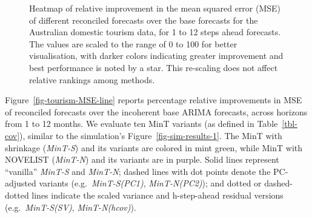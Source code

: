 \documentclass[
  11pt,
  letterpaper,
  DIV=11,
  numbers=noendperiod,
  titlepage]{scrartcl}
\begin{document}
\begin{figure}


\caption{\label{fig-tourism-MSE-heat}Heatmap of relative improvement in
the mean squared error (MSE) of different reconciled forecasts over the
base forecasts for the Australian domestic tourism data, for 1 to 12
steps ahead forecasts. The values are scaled to the range of 0 to 100
for better visualisation, with darker colors indicating greater
improvement and best performance is noted by a star. This re-scaling
does not affect relative rankings among methods.}

\end{figure}%

Figure~\ref{fig-tourism-MSE-line} reports percentage relative
improvements in MSE of reconciled forecasts over the incoherent base
ARIMA forecasts, across horizons from 1 to 12 months. We evaluate ten
MinT variants (as defined in Table~\ref{tbl-cov}), similar to the
simulation's Figure~\ref{fig-sim-results-1}. The MinT with shrinkage
(\emph{MinT-S}) and its variants are colored in mint green, while MinT
with NOVELIST (\emph{MinT-N}) and its variants are in purple. Solid
lines represent ``vanilla'' \emph{MinT-S} and \emph{MinT-N}; dashed
lines with dot points denote the PC-adjusted variants
(e.g.~\emph{MinT-S(PC1)}, \emph{MinT-N(PC2)}); and dotted or
dashed-dotted lines indicate the scaled variance and h-step-ahead
residual versions (e.g.~\emph{MinT-S(SV)}, \emph{MinT-N(hcov)}).
\end{document}
